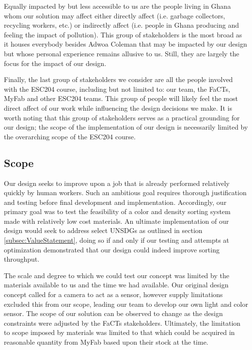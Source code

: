 \documentclass[12pt]{article}
\begin{document}
\begin{multicols*}{2}
            Equally impacted by but less accessible to us are the people living in Ghana whom our solution may affect either directly affect (i.e. garbage collectors, recycling workers, etc.) or indirectly affect (i.e. people in Ghana producing and feeling the impact of pollution). This group of stakeholders is the most broad as it houses everybody besides Adwoa Coleman that may be impacted by our design but whose personal experience remains allusive to us. Still, they are largely the focus for the impact of our design.
            
            Finally, the last group of stakeholders we consider are all the people involved with the ESC204 course, including but not limited to: our team, the FaCTs, MyFab and other ESC204 teams. This group of people will likely feel the most direct affect of our work while influencing the design decisions we make. It is worth noting that this group of stakeholders serves as a practical grounding for our design; the scope of the implementation of our design is necessarily limited by the overarching scope of the ESC204 course. 

        \subsection{Scope}
            Our design seeks to improve upon a job that is already performed relatively quickly by human workers. Such an ambitious goal requires thorough justification and testing before final development and implementation. Accordingly, our primary goal was to test the feasibility of a color and density sorting system made with relatively low cost materials. An ultimate implementation of our design would seek to address select UNSDGs as outlined in section \ref{subsec:ValueStatement}, doing so if and only if our testing and attempts at optimization demonstrated that our design could indeed improve sorting throughput.

            The scale and degree to which we could test our concept was limited by the materials available to us and the time we had available. Our original design concept called for a camera to act as a sensor, however supply limitations excluded this from our scope, leading our team to develop our own light and color sensor. The scope of our solution can be observed to change as the design constraints were adjusted by the FaCTs stakeholders. Ultimately, the limitation to scope imposed by materials was limited to that which could be acquired in reasonable quantity from MyFab based upon their stock at the time. 


\end{multicols*}
\end{document}
